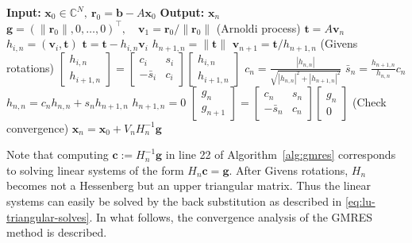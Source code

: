 \begin{algorithm}[H]\caption{{The GMRES method of modified Gram-Schmidt type}}\label{alg:gmres}\begin{algorithmic}[1]
\Statex\textbf{Input:} $\bm x_0\in\mathbb C^N,\ \bm r_0=\bm b-A\bm x_0$
\Statex\textbf{Output:} $\bm x_n$
\State $\bm g=(\|\bm r_0\|,0,\ldots,0)^{\top},\quad\bm v_1=\bm r_0/\|\bm r_0\|$
\State (Arnoldi {process})
\State $\bm t=A\bm v_n$
\State $h_{i,n}=(\bm v_i,\bm t)$
\State $\bm t=\bm t-h_{i,n}\bm v_i$
\EndFor
\State $h_{n+1,n}=\|\bm t\|$
\State $\bm v_{n+1}=\bm t/h_{n+1,n}$
\State (Givens {rotations})
\State $\begin{bmatrix}h_{i,n}\\h_{i+1,n}\end{bmatrix}=\begin{bmatrix}c_i&s_i\\-\bar s_i&c_i\end{bmatrix}\begin{bmatrix}h_{i,n}\\h_{i+1,n}\end{bmatrix}$
\EndFor
\State $c_n=\frac{|h_{n,n}|}{\sqrt{|h_{n,n}|^2+|h_{n+1,n}|^2}}$
\State $\bar s_n=\frac{h_{n+1,n}}{h_{n,n}}c_n$
\State $h_{n,n}=c_nh_{n,n}+s_nh_{n+1,n}$
\State $h_{n+1,n}=0$
\State $\begin{bmatrix}g_n\\g_{n+1}\end{bmatrix}=\begin{bmatrix}c_n&s_n\\-\bar s_n&c_n\end{bmatrix}\begin{bmatrix}g_n\\0\end{bmatrix}$
\State ({Check convergence})
\State $\bm x_n=\bm x_0+V_nH_n^{-1}\bm g$
\EndIf\EndFor\end{algorithmic}\end{algorithm}
{Note that computing $\bm c:=H_n^{-1}\bm g$ in line 22 of Algorithm\ \ref{alg:gmres} corresponds to solving linear systems of the form $H_n\bm c=\bm g$. After Givens rotations, $H_n$ becomes not a Hessenberg but an upper triangular matrix. Thus the linear systems can easily be solved by the back substitution as described in \eqref{eq:lu-triangular-solves}.}
{In what follows, the convergence analysis of the GMRES method is described.}

